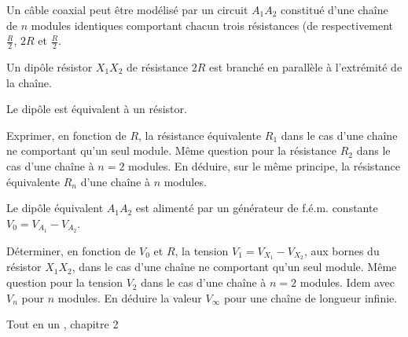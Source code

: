 \begin{Exercise}[title=Modélisation d'un cable coaxial]
  Un câble coaxial peut être modélisé par un circuit $A_1A_2$ constitué d'une chaîne de $n$ modules identiques comportant chacun trois résistances (de respectivement $\frac{R}{2}$, $2R$ et $\frac{R}{2}$.

  Un dipôle résistor $X_1X_2$ de résistance $2R$ est branché en parallèle à l'extrémité de la chaîne.


  \Question Le dipôle est équivalent à un résistor.

  \subQuestion Exprimer, en fonction de $R$, la résistance équivalente $R_1$ dans le cas d'une chaîne ne comportant qu'un seul module.
  \subQuestion Même question pour la résistance $R_2$ dans le cas d'une chaîne à $n=2$ modules.
  \subQuestion En déduire, sur le même principe, la résistance équivalente $R_n$ d'une chaîne à $n$ modules.

  \Question Le dipôle équivalent $A_1A_2$ est alimenté par un générateur de f.é.m. constante $V_0=V_{A_1} - V_{A_2}$.

  \subQuestion Déterminer, en fonction de $V_0$ et $R$, la tension $V_1 = V_{X_1} - V_{X_2}$, aux bornes du résistor $X_1X_2$, dans le cas d'une chaîne ne comportant qu'un seul module.
  \subQuestion Même question pour la tension $V_2$ dans le cas d'une chaîne à $n=2$ modules.
  \subQuestion Idem avec $V_n$ pour $n$ modules.
  \subQuestion En déduire la valeur $V_\infty$ pour une chaîne de longueur infinie.

\end{Exercise}
\begin{Answer}
  Tout en un , chapitre 2
\end{Answer}
